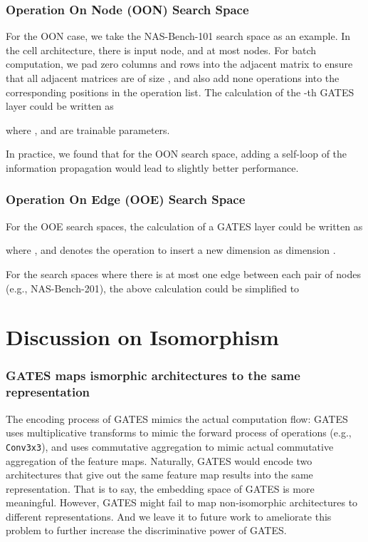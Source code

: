 \documentclass[runningheads]{llncs}
\begin{document}
\subsubsection{Operation On Node (OON) Search Space}

For the OON case, we take the NAS-Bench-101 search space as an example. In the cell architecture, there is  input node, and at most  nodes. For batch computation, we pad zero columns and rows into the adjacent matrix to ensure that all adjacent matrices are of size , and also add none operations into the corresponding positions in the operation list. The calculation of the -th GATES layer could be written as

where , and  are trainable parameters.



In practice, we found that for the OON search space, adding a self-loop of the information propagation would lead to slightly better performance. 



\subsubsection{Operation On Edge (OOE) Search Space}

For the OOE search spaces, the calculation of a GATES layer could be written as

where , and  denotes the operation to insert a new dimension as dimension \textit{}.

For the search spaces where there is at most one edge between each pair of nodes (e.g., NAS-Bench-201), the above calculation could be simplified to




\section{Discussion on Isomorphism}

\subsubsection{GATES maps ismorphic architectures to the same representation}
The encoding process of GATES mimics the actual computation flow: GATES uses multiplicative transforms to mimic the forward process of operations (e.g., \texttt{Conv3x3}), and uses commutative aggregation to mimic actual commutative aggregation of the feature maps.
Naturally, GATES would encode two architectures that give out the same feature map results into the same representation. That is to say, the embedding space of GATES is more meaningful. However, GATES might fail to map non-isomorphic architectures to different representations. And we leave it to future work to ameliorate this problem to further increase the discriminative power of GATES.
\end{document}
